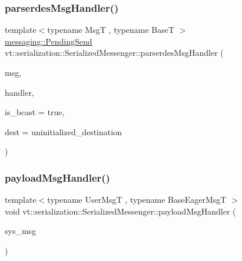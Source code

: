 \mbox{\label{structvt_1_1serialization_1_1_serialized_messenger_a580f601ea65f1d413c253840b726a0f9}} 
\subsubsection{\texorpdfstring{parserdes\+Msg\+Handler()}{parserdesMsgHandler()}}
{\footnotesize\ttfamily template$<$typename MsgT , typename BaseT $>$ \\
\hyperlink{structvt_1_1messaging_1_1_pending_send}{messaging\+::\+Pending\+Send} vt\+::serialization\+::\+Serialized\+Messenger\+::parserdes\+Msg\+Handler (\begin{DoxyParamCaption}\item[{MsgT $\ast$}]{msg,  }\item[{\hyperlink{namespacevt_af64846b57dfcaf104da3ef6967917573}{Handler\+Type} const \&}]{handler,  }\item[{bool}]{is\+\_\+bcast = {\ttfamily true},  }\item[{\hyperlink{namespacevt_a866da9d0efc19c0a1ce79e9e492f47e2}{Node\+Type}}]{dest = {\ttfamily uninitialized\+\_\+destination} }\end{DoxyParamCaption})\hspace{0.3cm}{\ttfamily [static]}}

\mbox{\label{structvt_1_1serialization_1_1_serialized_messenger_adef4a4664f9eab8eca28304871540791}} 
\subsubsection{\texorpdfstring{payload\+Msg\+Handler()}{payloadMsgHandler()}}
{\footnotesize\ttfamily template$<$typename User\+MsgT , typename Base\+Eager\+MsgT $>$ \\
void vt\+::serialization\+::\+Serialized\+Messenger\+::payload\+Msg\+Handler (\begin{DoxyParamCaption}\item[{\hyperlink{namespacevt_1_1serialization_af3a0dfd4a0d3fa09c75edba0dc1b7fec}{Serial\+Eager\+Payload\+Msg}$<$ User\+MsgT, Base\+Eager\+MsgT $>$ $\ast$}]{sys\+\_\+msg }\end{DoxyParamCaption})\hspace{0.3cm}{\ttfamily [static]}}


